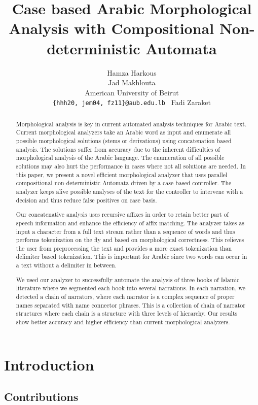 \documentclass[11pt,letterpaper]{article}
\title{Case based Arabic Morphological Analysis with 
    Compositional Non-deterministic Automata }
\author{Hamza Harkous \\
  \And
  Jad Makhlouta \\
  American University of Beirut \\
  {\tt \{hhh20, jem04, fz11\}@aub.edu.lb }
  \And 
      Fadi Zaraket 
}
\date{}
\begin{document}
\maketitle
\begin{abstract}
  Morphological analysis is key in current automated analysis techniques 
  for Arabic text. 
  Current morphological analyzers take an Arabic word as input and 
  enumerate all possible morphological solutions (stems or 
  derivations) using concatenation based analysis.
  The solutions suffer from accuracy due to the inherent difficulties
  of morphological analysis of the Arabic language. 
  The enumeration of all possible solutions may also hurt the performance
  in cases where not all solutions are needed.
  In this paper, we present a novel efficient morphological analyzer that 
  uses parallel compositional non-deterministic Automata 
  driven by a case based controller.
  The analyzer keeps alive possible analyses of the text 
  for the controller to intervene with a decision and thus 
  reduce false positives on case basis.

  Our concatenative analysis uses recursive affixes in order to
  retain better part of speech information and enhance the 
  efficiency of affix matching. 
  The analyzer takes as input a character from a full text stream 
  rather than a sequence of words and thus performs tokenization
  on the fly and based on morphological correctness. 
  This relieves the user from preprocessing the text and provides
  a more exact tokenization than delimiter based tokenization. 
  This is important for Arabic since two words can occur in a text
  without a delimiter in between.

  We used our analyzer to successfully automate the analysis of 
  three books of Islamic literature where we segmented each book
  into several narrations. In each narration, we detected 
  a chain of narrators, where each narrator is a complex sequence of
  proper names separated with name connector phrases. 
  This is a collection of chain of narrator structures where each
  chain is a structure with three levels of hierarchy.
  Our results show better accuracy and higher efficiency than current 
  morphological analyzers. 
\end{abstract}

\section{Introduction}


\subsection{Contributions}
\end{document}
